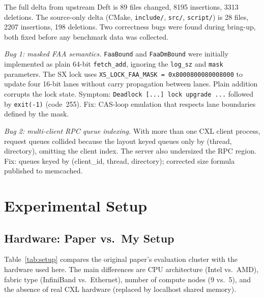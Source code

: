 \documentclass[10pt,twocolumn]{article}
\begin{document}
The full delta from upstream Deft is 89 files changed, 8195 insertions,
3313 deletions.
The source-only delta (CMake, \texttt{include/}, \texttt{src/},
\texttt{script/}) is 28 files, 2207 insertions, 198 deletions.
Two correctness bugs were found during bring-up, both fixed before any
benchmark data was collected.

\textit{Bug 1: masked FAA semantics.}
\texttt{FaaBound} and \texttt{FaaDmBound} were initially implemented as plain
64-bit \texttt{fetch\_add}, ignoring the \texttt{log\_sz} and \texttt{mask}
parameters.
The SX lock uses \texttt{XS\_LOCK\_FAA\_MASK = 0x8000800080008000} to update
four 16-bit lanes without carry propagation between lanes.
Plain addition corrupts the lock state.
Symptom: \texttt{Deadlock [...] lock upgrade ...} followed by
\texttt{exit(-1)} (code~255).
Fix: CAS-loop emulation that respects lane boundaries defined by the mask.

\textit{Bug 2: multi-client RPC queue indexing.}
With more than one CXL client process, request queues collided because the
layout keyed queues only by (thread, directory), omitting the client index.
The server also undersized the RPC region.
Fix: queues keyed by (client\_id, thread, directory); corrected size formula
published to memcached.

\section{Experimental Setup}

\subsection{Hardware: Paper vs.\ My Setup}

Table~\ref{tab:setup} compares the original paper's evaluation cluster with the
hardware used here.
The main differences are CPU architecture (Intel vs.\ AMD), fabric type
(InfiniBand vs.\ Ethernet), number of compute nodes (9 vs.\ 5), and the
absence of real CXL hardware (replaced by localhost shared memory).
\end{document}
